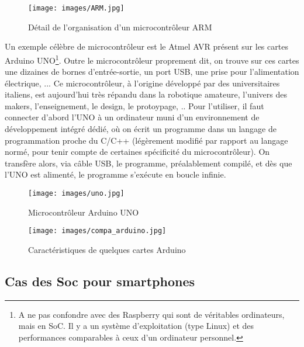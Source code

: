 \documentclass[11pt,a4paper,french,twoside]{PMCours}
\begin{document}
\begin{center}
\begin{figure}[ht]
\centering
\texttt{[image: images/ARM.jpg]}
 \caption{Détail de l'organisation d'un microcontrôleur ARM}
\end{figure}
\end{center}

Un exemple célèbre de microcontrôleur est le Atmel AVR présent sur les cartes Arduino UNO\footnote{A ne pas confondre avec des Raspberry qui sont de véritables ordinateurs, mais en SoC. Il y a un système d'exploitation (type Linux) et des performances comparables à ceux d'un ordinateur personnel.}. Outre le microcontrôleur proprement dit, on trouve sur ces cartes  une dizaines de bornes d'entrée-sortie, un port USB, une prise pour l'alimentation électrique, ... Ce microcontrôleur, à l'origine développé par des universitaires italiens, est aujourd'hui très répandu dans la robotique amateure, l'univers des makers, l'enseignement, le design, le protoypage, .. Pour l'utiliser, il faut connecter d'abord l'UNO à un ordinateur muni d'un environnement de développement intégré dédié, où on écrit un programme dans un  langage de programmation proche du C/C++ (légèrement modifié par rapport au langage normé, pour tenir compte de certaines spécificité du microcontrôleur). On transfère alors, via câble USB, le programme, préalablement compilé, et dès que l'UNO est alimenté, le programme s'exécute en boucle infinie.

\begin{center}
\begin{figure}[ht]
\centering
\texttt{[image: images/uno.jpg]}
 \caption{Microcontrôleur Arduino UNO}
\end{figure}
\begin{figure}[ht]
\centering
\texttt{[image: images/compa\_arduino.jpg]}
 \caption{Caractéristiques de quelques cartes Arduino}
\end{figure}
\end{center}

\subsection{Cas des Soc pour smartphones}
\end{document}
